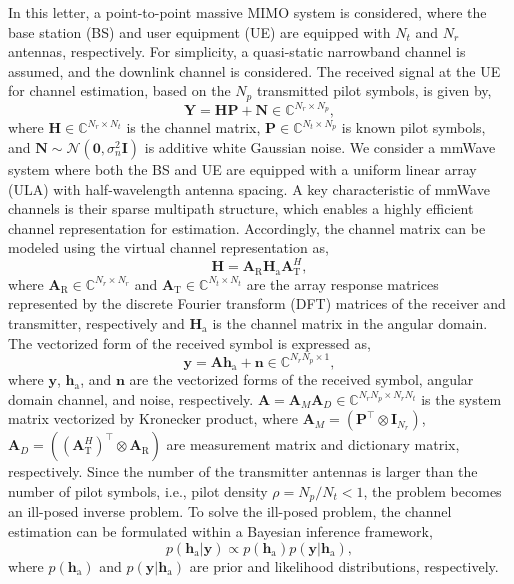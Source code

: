 \documentclass[lettersize,journal]{IEEEtran}
\begin{document}
In this letter, a point-to-point massive MIMO system is considered, where the base station (BS) and user equipment (UE) are equipped with $N_{t}$ and $N_{r}$ antennas, respectively. For simplicity, a quasi-static narrowband channel is assumed, and the downlink channel is considered. The received signal at the UE for channel estimation, based on the $N_{p}$ transmitted pilot symbols, is given by,
\begin{equation}
\mathbf{Y}=\mathbf{H}\mathbf{P}+\mathbf{N}\in \mathbb{C}^{N_{r}\times N_{p}},
\end{equation}
where $\mathbf{H}\in \mathbb{C}^{N_{r}\times N_{t}}$ is the channel matrix, $\mathbf{P}\in \mathbb{C}^{N_{t}\times N_{p}}$ is known pilot symbols, and $\mathbf{N}\sim\mathcal{N}(\mathbf{0},\sigma^{2}_{n}\mathbf{I})$ is additive white Gaussian noise. We consider a mmWave system where both the BS and UE are equipped with a uniform linear array (ULA) with half-wavelength antenna spacing. A key characteristic of mmWave channels is their sparse multipath structure, which enables a highly efficient channel representation for estimation. Accordingly, the channel matrix can be modeled using the virtual channel representation as,
\begin{equation}
\mathbf{H} = \mathbf{A}_{\text{R}}\mathbf{H}_{\text{a}}\mathbf{A}_{\text{T}}^{H},
\end{equation}
where $\mathbf{A}_{\text{R}}\in \mathbb{C}^{N_{r}\times N_{r}}$ and $\mathbf{A}_{\text{T}}\in \mathbb{C}^{N_{t}\times N_{t}}$ are the array response matrices represented by the discrete Fourier transform (DFT) matrices of the receiver and transmitter, respectively and $\mathbf{H}_{\text{a}}$ is the channel matrix in the angular domain.
The vectorized form of the received symbol is expressed as,
\begin{equation}
\mathbf{y} = \mathbf{A}\mathbf{h}_{\text{a}}+\mathbf{n}\in \mathbb{C}^{N_{r}N_{p}\times 1},
\end{equation}
where $\mathbf{y}$, $\mathbf{h}_{\text{a}}$, and $\mathbf{n}$ are the vectorized forms of the received symbol, angular domain channel, and noise, respectively. $\mathbf{A}=\mathbf{A}_{M}\mathbf{A}_{D}\in \mathbb{C}^{N_{r}N_{p}\times N_{r}N_{t}}$ is the system matrix vectorized by Kronecker product, where $\mathbf{A}_{M} = (\mathbf{P}^{\top}\otimes\mathbf{I}_{N_{r}})$, $\mathbf{A}_{D}=((\mathbf{A}_{\text{T}}^{H})^{\top}\otimes \mathbf{A}_{\text{R}})$ are measurement matrix and dictionary matrix, respectively.
Since the number of the transmitter antennas is larger than the number of pilot symbols, i.e., pilot density $\rho=N_{p}/N_{t}<1$, the problem becomes an ill-posed inverse problem.
To solve the ill-posed problem, the channel estimation can be formulated within a Bayesian inference framework,
\begin{equation}
  p(\mathbf{h}_{\text{a}}|\mathbf{y})\propto p(\mathbf{h}_{\text{a}})p(\mathbf{y}|\mathbf{h}_{\text{a}}),
\end{equation}
where $p(\mathbf{h}_{\text{a}})$ and $p(\mathbf{y}|\mathbf{h}_{\text{a}})$ are prior and likelihood distributions, respectively.
\end{document}
